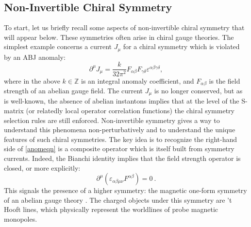 \documentclass[11pt,a4paper]{article}
\begin{document}
\subsection{Non-Invertible Chiral Symmetry}
\label{sec:nis}

To start, let us briefly recall some aspects of non-invertible chiral symmetry \cite{Choi:2022jqy, Cordova:2022ieu} that will appear below.  These symmetries often arise in chiral gauge theories.  The simplest example concerns a current $J_{\mu}$ for a chiral symmetry which is violated by an ABJ anomaly:
\begin{equation}\label{anomeqn}
    \partial^{\mu}J_{\mu}=\frac{k}{32\pi^{2}}F_{\alpha \beta}F_{\gamma \delta}\varepsilon^{\alpha \beta \gamma \delta},
\end{equation}
where in the above $k\in \mathbb{Z}$ is an integral anomaly coefficient, and $F_{\alpha\beta}$ is the field strength of an abelian gauge field.  The current $J_{\mu}$ is no longer conserved, but as is well-known, the absence of abelian instantons implies that at the level of the S-matrix (or relatedly local operator correlation functions) the chiral symmetry selection rules are still enforced.  Non-invertible symmetry gives a way to understand this phenomena non-perturbatively and to understand the unique features of such chiral symmetries.  The key idea is to recognize the right-hand side of \eqref{anomeqn} is a composite operator which is itself built from symmetry currents.  Indeed, the Bianchi identity implies that the field strength operator is closed, or more explicitly:
\begin{equation}\label{onefcons}
    \partial^{\mu}\left(\varepsilon_{\alpha \beta \mu \nu}F^{\alpha \beta}\right)=0~.
\end{equation}
This signals the presence of a higher symmetry: the magnetic one-form symmetry of an abelian gauge theory \cite{Gaiotto:2014kfa}.  The charged objects under this symmetry are 't Hooft lines, which physically represent the worldlines of probe magnetic monopoles.    
\end{document}

